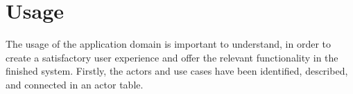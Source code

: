 \section{Usage}\label{sc:usage}
The usage of the application domain is important to understand, in order to create a satisfactory user experience and offer the relevant functionality in the finished system. Firstly, the actors and use cases have been identified, described, and connected in an actor table.